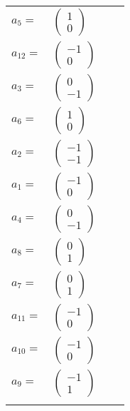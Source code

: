 \documentclass[1p]{elsarticle_modified}
\theoremstyle{definition}
\begin{document}
\begin{tabular}{m{7pt} m{180pt} m{7pt} m{180pt} }
\flushright $a_{5}=$&$\begin{pmatrix}1\\0\end{pmatrix}$ \\
\flushright $a_{12}=$&$\begin{pmatrix}-1\\0\end{pmatrix}$ \\
\flushright $a_{3}=$&$\begin{pmatrix}0\\-1\end{pmatrix}$ \\
\flushright $a_{6}=$&$\begin{pmatrix}1\\0\end{pmatrix}$ \\
\flushright $a_{2}=$&$\begin{pmatrix}-1\\-1\end{pmatrix}$ \\
\flushright $a_{1}=$&$\begin{pmatrix}-1\\0\end{pmatrix}$ \\
\flushright $a_{4}=$&$\begin{pmatrix}0\\-1\end{pmatrix}$ \\
\flushright $a_{8}=$&$\begin{pmatrix}0\\1\end{pmatrix}$ \\
\flushright $a_{7}=$&$\begin{pmatrix}0\\1\end{pmatrix}$ \\
\flushright $a_{11}=$&$\begin{pmatrix}-1\\0\end{pmatrix}$ \\
\flushright $a_{10}=$&$\begin{pmatrix}-1\\0\end{pmatrix}$ \\
\flushright $a_{9}=$&$\begin{pmatrix}-1\\1\end{pmatrix}$\\&\end{tabular}
\end{document}
